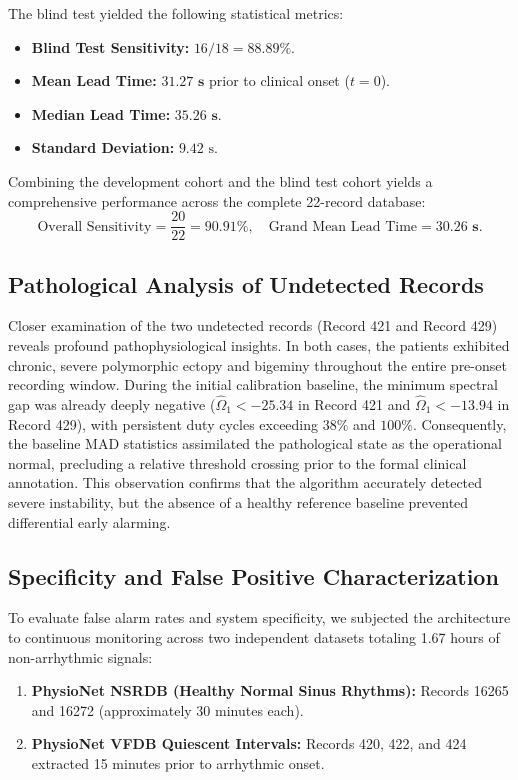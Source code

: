 \documentclass[11pt,a4paper]{article}
\begin{document}
The blind test yielded the following statistical metrics:
\begin{itemize}
    \item \textbf{Blind Test Sensitivity:} $16 / 18 = \mathbf{88.89\%}$.
    \item \textbf{Mean Lead Time:} $\mathbf{31.27\text{ s}}$ prior to clinical onset ($t = 0$).
    \item \textbf{Median Lead Time:} $\mathbf{35.26\text{ s}}$.
    \item \textbf{Standard Deviation:} $9.42\text{ s}$.
\end{itemize}

Combining the development cohort and the blind test cohort yields a comprehensive performance across the complete 22-record database:
\begin{equation}
\text{Overall Sensitivity} = \frac{20}{22} = \mathbf{90.91\%}, \quad \text{Grand Mean Lead Time} = \mathbf{30.26\text{ s}}.
\end{equation}

\subsection{Pathological Analysis of Undetected Records}

Closer examination of the two undetected records (Record 421 and Record 429) reveals profound pathophysiological insights. In both cases, the patients exhibited chronic, severe polymorphic ectopy and bigeminy throughout the entire pre-onset recording window. During the initial calibration baseline, the minimum spectral gap was already deeply negative ($\hat{\Omega}_1 < -25.34$ in Record 421 and $\hat{\Omega}_1 < -13.94$ in Record 429), with persistent duty cycles exceeding $38\%$ and $100\%$. Consequently, the baseline MAD statistics assimilated the pathological state as the operational normal, precluding a relative threshold crossing prior to the formal clinical annotation. This observation confirms that the algorithm accurately detected severe instability, but the absence of a healthy reference baseline prevented differential early alarming.

\subsection{Specificity and False Positive Characterization}

To evaluate false alarm rates and system specificity, we subjected the architecture to continuous monitoring across two independent datasets totaling 1.67 hours of non-arrhythmic signals:
\begin{enumerate}
    \item \textbf{PhysioNet NSRDB (Healthy Normal Sinus Rhythms):} Records 16265 and 16272 (approximately 30 minutes each).
    \item \textbf{PhysioNet VFDB Quiescent Intervals:} Records 420, 422, and 424 extracted 15 minutes prior to arrhythmic onset.
\end{enumerate}
\end{document}
